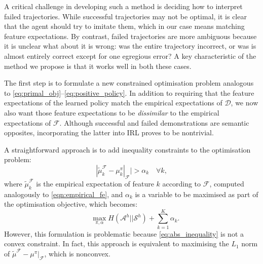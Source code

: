 \documentclass{aamas2016}
\newcommand{\aama}[1]{\textcolor{dim_gray}{AAMAS: #1}}
\begin{document}
A critical challenge in developing such a method is deciding how to interpret failed trajectories.  While successful trajectories may not be optimal, it is clear that the agent should try to imitate them, which in our case means matching feature expectations.  By contrast, failed trajectories are more ambiguous because it is unclear what about it is wrong: was the entire trajectory incorrect, or was is almost entirely correct except for one egregious error?  A key characteristic of the method we propose is that it works well in both these cases.


The first step is to formulate a new constrained optimisation problem analogous to \eqref{eq:primal_obj}--\eqref{eq:positive_policy}. In addition to requiring that the feature expectations of the learned policy match the empirical expectations of $\mathcal{D}$, we now also want those feature expectations to be \emph{dissimilar} to the empirical expectations of $\mathcal{F}$. Although successful and failed demonstrations are semantic opposites, incorporating the latter into IRL proves to be nontrivial.

A straightforward approach is to add inequality constraints to the optimisation problem:
	\begin{equation}
        \label{eq:abs_inequality}
	|\widetilde{\mu}^{\mathcal{F}}_k  - \mu^{\pi}_k|_{\mathcal{F}}| > \alpha_k \quad\forall k,
	\end{equation} 
where $\widetilde{\mu}^{\mathcal{F}}_k$ is the empirical expectation of feature $k$ according to $\mathcal{F}$, computed analogously to \eqref{eqn:empirical_fe}, and $\alpha_k$ is a variable to be maximised as part of the optimisation objective, which becomes:
	\begin{equation}
		\quad\max\limits_{\pi,\alpha} H(\mathcal{A}^h||\mathcal{S}^h) + \sum^K_{k=1} \alpha_k.
	\end{equation}
However, this formulation is problematic because \eqref{eq:abs_inequality} is not a convex constraint. In fact, this approach is equivalent to maximising the $L_1$ norm of $\widetilde{\mu}^{\mathcal{F}}  - \mu^{\pi}|_{\mathcal{F}}$, which is nonconvex.
\end{document}
